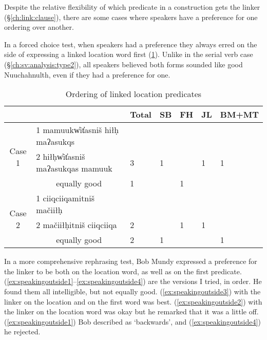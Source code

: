 Despite the relative flexibility of which predicate in a construction gets the linker (\S\ref{ch:link:clause}), there are some cases where speakers have a preference for one ordering over another.

In a forced choice test, when speakers had a preference they always erred on the side of expressing a linked location word first (\cref{table:orderinglinkloc}). Unlike in the serial verb case (\S\ref{ch:sv:analysis:type2}), all speakers believed both forms sounded like good Nuuchahnulth, even if they had a preference for one.

\begin{table}[H]
\centering
\caption{Ordering of linked location predicates}
\label{table:orderinglinkloc}
\begin{tabular}{cllllll}
 &  & Total & SB & FH & JL & BM+MT \\ \hline
\multicolumn{1}{|c|}{\multirow{3}{*}{Case 1}} & \multicolumn{1}{l|}{1 mamuukw̓it̓asniš hiłḥ maʔasukqs} & \multicolumn{1}{l|}{} & \multicolumn{1}{l|}{} & \multicolumn{1}{l|}{} & \multicolumn{1}{l|}{} & \multicolumn{1}{l|}{} \\ \cline{2-7} 
\multicolumn{1}{|c|}{} & \multicolumn{1}{l|}{2 hiłḥw̓it̓asniš maʔasukqas mamuuk} & \multicolumn{1}{l|}{3} & \multicolumn{1}{l|}{1} & \multicolumn{1}{l|}{} & \multicolumn{1}{l|}{1} & \multicolumn{1}{l|}{1} \\ \cline{2-7} 
\multicolumn{1}{|c|}{} & \multicolumn{1}{c|}{equally good} & \multicolumn{1}{l|}{1} & \multicolumn{1}{l|}{} & \multicolumn{1}{l|}{1} & \multicolumn{1}{l|}{} & \multicolumn{1}{l|}{} \\ \hline \hline
\multicolumn{1}{|c|}{\multirow{3}{*}{Case 2}} & \multicolumn{1}{l|}{1 ciiqciiqamitniš mačiiłḥ} & \multicolumn{1}{l|}{} & \multicolumn{1}{l|}{} & \multicolumn{1}{l|}{} & \multicolumn{1}{l|}{} & \multicolumn{1}{l|}{} \\ \cline{2-7} 
\multicolumn{1}{|c|}{} & \multicolumn{1}{l|}{2 mačiiłḥitniš ciiqciiqa} & \multicolumn{1}{l|}{2} & \multicolumn{1}{l|}{} & \multicolumn{1}{l|}{1} & \multicolumn{1}{l|}{1} & \multicolumn{1}{l|}{} \\ \cline{2-7} 
\multicolumn{1}{|c|}{} & \multicolumn{1}{c|}{equally good} & \multicolumn{1}{l|}{2} & \multicolumn{1}{l|}{1} & \multicolumn{1}{l|}{} & \multicolumn{1}{l|}{} & \multicolumn{1}{l|}{1} \\ \hline
\end{tabular}
\end{table}

In a more comprehensive rephrasing test, Bob Mundy expressed a preference for the linker to be both on the location word, as well as on the first predicate. (\ref{ex:speakingoutside1}--\ref{ex:speakingoutside4}) are the versions I tried, in order. He found them all intelligible, but not equally good. (\ref{ex:speakingoutside3}) with the linker on the location and on the first word was best. (\ref{ex:speakingoutside2}) with the linker on the location word was okay but he remarked that it was a little off. (\ref{ex:speakingoutside1}) Bob described as `backwards', and (\ref{ex:speakingoutside4}) he rejected.

